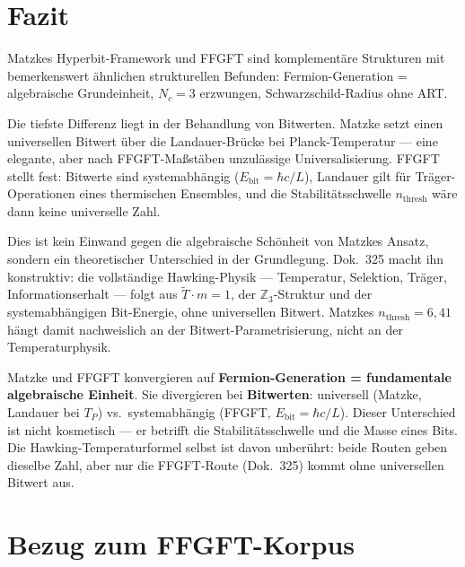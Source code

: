 \section*{Fazit}

Matzkes Hyperbit-Framework und FFGFT sind komplementäre Strukturen mit
bemerkenswert ähnlichen strukturellen Befunden: Fermion-Generation = algebraische
Grundeinheit, $N_c = 3$ erzwungen, Schwarzschild-Radius ohne ART.

Die tiefste Differenz liegt in der Behandlung von Bitwerten.
Matzke setzt einen universellen Bitwert über die Landauer-Brücke bei Planck-Temperatur —
eine elegante, aber nach FFGFT-Maßstäben unzulässige Universalisierung.
FFGFT stellt fest: Bitwerte sind systemabhängig ($E_{\mathrm{bit}} = \hbar c/L$),
Landauer gilt für Träger-Operationen eines thermischen Ensembles,
und die Stabilitätsschwelle $n_{\mathrm{thresh}}$ wäre dann keine universelle Zahl.

Dies ist kein Einwand gegen die algebraische Schönheit von Matzkes Ansatz,
sondern ein theoretischer Unterschied in der Grundlegung.
Dok.\ 325 macht ihn konstruktiv: die vollständige Hawking-Physik —
Temperatur, Selektion, Träger, Informationserhalt — folgt aus
$\tilde{T}\cdot m = 1$, der $\mathbb{Z}_3$-Struktur und der
systemabhängigen Bit-Energie, ohne universellen Bitwert.
Matzkes $n_{\mathrm{thresh}} = 6{,}41$ hängt damit nachweislich an der
Bitwert-Parametrisierung, nicht an der Temperaturphysik.

\begin{tcolorbox}[ffgftbox, title={Hauptbefund}]
  Matzke und FFGFT konvergieren auf \textbf{Fermion-Generation = fundamentale algebraische Einheit}.
  Sie divergieren bei \textbf{Bitwerten}: universell (Matzke, Landauer bei $T_P$)
  vs.\ systemabhängig (FFGFT, $E_{\mathrm{bit}} = \hbar c/L$).
  Dieser Unterschied ist nicht kosmetisch — er betrifft die Stabilitätsschwelle
  und die Masse eines Bits. Die Hawking-Temperaturformel selbst ist davon
  unberührt: beide Routen geben dieselbe Zahl, aber nur die FFGFT-Route
  (Dok.\ 325) kommt ohne universellen Bitwert aus.
\end{tcolorbox}

\section*{Bezug zum FFGFT-Korpus}


